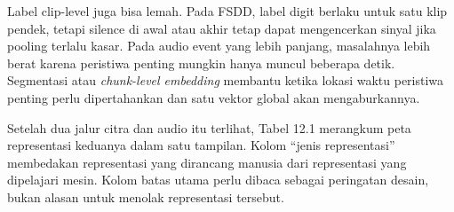 Label clip-level juga bisa lemah. Pada FSDD, label digit berlaku untuk satu klip pendek, tetapi silence di awal atau akhir tetap dapat mengencerkan sinyal jika pooling terlalu kasar. Pada audio event yang lebih panjang, masalahnya lebih berat karena peristiwa penting mungkin hanya muncul beberapa detik. Segmentasi atau \emph{chunk-level embedding} membantu ketika lokasi waktu peristiwa penting perlu dipertahankan dan satu vektor global akan mengaburkannya.

Setelah dua jalur citra dan audio itu terlihat, Tabel 12.1 merangkum peta representasi keduanya dalam satu tampilan. Kolom ``jenis representasi'' membedakan representasi yang dirancang manusia dari representasi yang dipelajari mesin. Kolom batas utama perlu dibaca sebagai peringatan desain, bukan alasan untuk menolak representasi tersebut.


